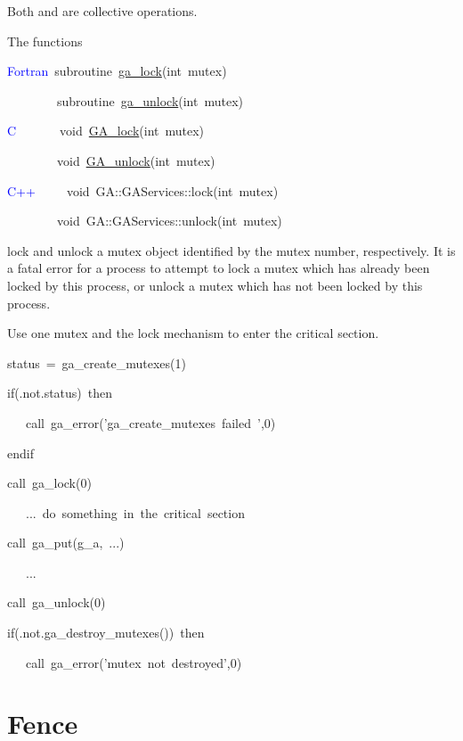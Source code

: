Both \texttt{} and \texttt{}
are collective operations.

The functions
\begin{lyxcode}
\textcolor{blue}{Fortran}~subroutine~\href{http://www.emsl.pnl.gov/docs/global/ga_ops.html\#ga_lock}{ga\_{}lock}(int~mutex)~

~~~~~~~~subroutine~\href{http://www.emsl.pnl.gov/docs/global/ga_ops.html\#ga_unlock}{ga\_{}unlock}(int~mutex)~

\textcolor{blue}{C}~~~~~~~void~\href{http://www.emsl.pnl.gov/docs/global/c_nga_ops.html\#ga_lock}{GA\_{}lock}(int~mutex)~

~~~~~~~~void~\href{http://www.emsl.pnl.gov/docs/global/c_nga_ops.html\#ga_unlock}{GA\_{}unlock}(int~mutex)~

\textcolor{blue}{C++}~~~~~void~GA::GAServices::lock(int~mutex)~

~~~~~~~~void~GA::GAServices::unlock(int~mutex)
\end{lyxcode}
lock and unlock a mutex object identified by the mutex number, respectively.
It is a fatal error for a process to attempt to lock a mutex which
has already been locked by this process, or unlock a mutex which has
not been locked by this process.

\emph{}\underbar{ }\emph{}\underbar{:}

Use one mutex and the lock mechanism to enter the critical section.
\begin{lyxcode}
status~=~ga\_create\_mutexes(1)~

if(.not.status)~then~

~~~call~ga\_error('ga\_create\_mutexes~failed~',0)~

endif~

call~ga\_lock(0)

~~~...~do~something~in~the~critical~section~

call~ga\_put(g\_a,~...)~

~~~...

call~ga\_unlock(0)~

if(.not.ga\_destroy\_mutexes())~then~

~~~call~ga\_error('mutex~not~destroyed',0)~
\end{lyxcode}

\section{Fence }

